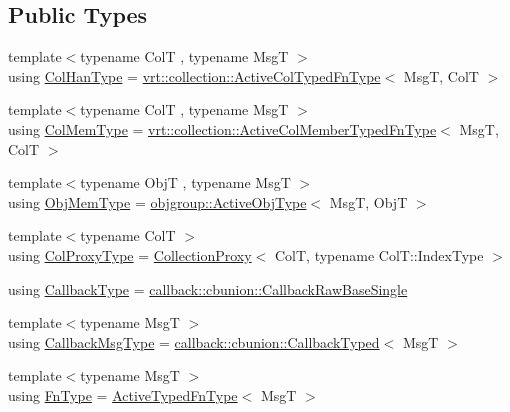 \subsection*{Public Types}
\begin{DoxyCompactItemize}
\item 
{\footnotesize template$<$typename ColT , typename MsgT $>$ }\\using \hyperlink{structvt_1_1pipe_1_1_pipe_manager_t_l_a0bf4e2e805b3ce2be9f499e0e39aadfa}{Col\+Han\+Type} = \hyperlink{namespacevt_1_1vrt_1_1collection_a1f4b9c5fe895842f49952a29592bc206}{vrt\+::collection\+::\+Active\+Col\+Typed\+Fn\+Type}$<$ MsgT, ColT $>$
\item 
{\footnotesize template$<$typename ColT , typename MsgT $>$ }\\using \hyperlink{structvt_1_1pipe_1_1_pipe_manager_t_l_abf7ad21be4f3d0db51d643aa8ea959cc}{Col\+Mem\+Type} = \hyperlink{namespacevt_1_1vrt_1_1collection_a87925616c03cf4ccc548d33b2fe172ee}{vrt\+::collection\+::\+Active\+Col\+Member\+Typed\+Fn\+Type}$<$ MsgT, ColT $>$
\item 
{\footnotesize template$<$typename ObjT , typename MsgT $>$ }\\using \hyperlink{structvt_1_1pipe_1_1_pipe_manager_t_l_a1a8a2e05fd84f8ac7b7dda4b64e5abe5}{Obj\+Mem\+Type} = \hyperlink{namespacevt_1_1objgroup_a979bd9dc714fdacafc4b83f98271bc23}{objgroup\+::\+Active\+Obj\+Type}$<$ MsgT, ObjT $>$
\item 
{\footnotesize template$<$typename ColT $>$ }\\using \hyperlink{structvt_1_1pipe_1_1_pipe_manager_t_l_af56c58cad882496e35f01227d4da3898}{Col\+Proxy\+Type} = \hyperlink{namespacevt_a0d58a693bfb96e0ce5d145692a1a1f98}{Collection\+Proxy}$<$ ColT, typename Col\+T\+::\+Index\+Type $>$
\item 
using \hyperlink{structvt_1_1pipe_1_1_pipe_manager_t_l_a1cc1d0f1c80a36488f9b5d282e9755d2}{Callback\+Type} = \hyperlink{structvt_1_1pipe_1_1callback_1_1cbunion_1_1_callback_raw_base_single}{callback\+::cbunion\+::\+Callback\+Raw\+Base\+Single}
\item 
{\footnotesize template$<$typename MsgT $>$ }\\using \hyperlink{structvt_1_1pipe_1_1_pipe_manager_t_l_af6fc2c17f1729fa06450441b0ee81cb1}{Callback\+Msg\+Type} = \hyperlink{structvt_1_1pipe_1_1callback_1_1cbunion_1_1_callback_typed}{callback\+::cbunion\+::\+Callback\+Typed}$<$ MsgT $>$
\item 
{\footnotesize template$<$typename MsgT $>$ }\\using \hyperlink{structvt_1_1pipe_1_1_pipe_manager_t_l_ac2c474a68a93bbc8e1d86eb99dabf1dc}{Fn\+Type} = \hyperlink{namespacevt_a54eefd5373739c7365058b0d22fea6e2}{Active\+Typed\+Fn\+Type}$<$ MsgT $>$

\end{DoxyCompactItemize}
